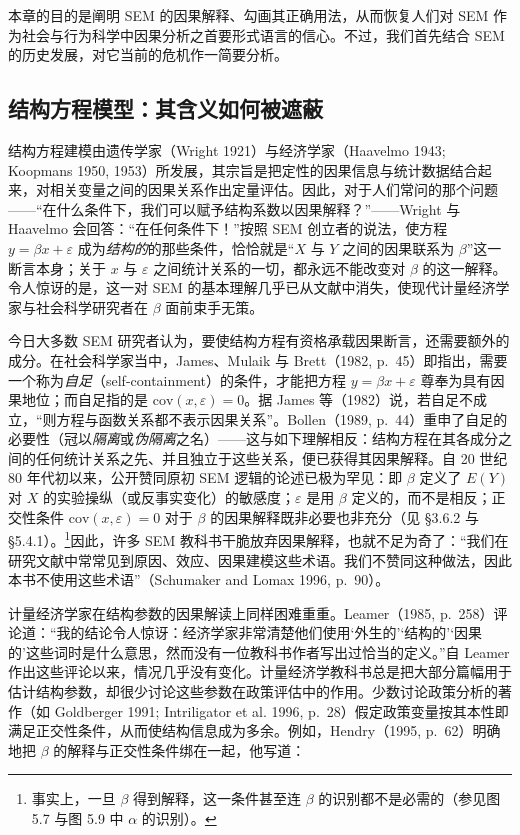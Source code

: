 本章的目的是阐明 SEM 的因果解释、勾画其正确用法，从而恢复人们对 SEM 作为社会与行为科学中因果分析之首要形式语言的信心。不过，我们首先结合 SEM 的历史发展，对它当前的危机作一简要分析。

\subsection{结构方程模型：其含义如何被遮蔽}

结构方程建模由遗传学家（Wright 1921）与经济学家（Haavelmo 1943; Koopmans 1950, 1953）所发展，其宗旨是把定性的因果信息与统计数据结合起来，对相关变量之间的因果关系作出定量评估。因此，对于人们常问的那个问题——“在什么条件下，我们可以赋予结构系数以因果解释？”——Wright 与 Haavelmo 会回答：“在任何条件下！”按照 SEM 创立者的说法，使方程 $y=\beta x+\varepsilon$ 成为\emph{结构的}的那些条件，恰恰就是“$X$ 与 $Y$ 之间的因果联系为 $\beta$”这一断言本身；关于 $x$ 与 $\varepsilon$ 之间统计关系的一切，都永远不能改变对 $\beta$ 的这一解释。令人惊讶的是，这一对 SEM 的基本理解几乎已从文献中消失，使现代计量经济学家与社会科学研究者在 $\beta$ 面前束手无策。

今日大多数 SEM 研究者认为，要使结构方程有资格承载因果断言，还需要额外的成分。在社会科学家当中，James、Mulaik 与 Brett（1982, p.~45）即指出，需要一个称为\emph{自足}（self-containment）的条件，才能把方程 $y=\beta x+\varepsilon$ 尊奉为具有因果地位；而自足指的是 $\mathrm{cov}(x,\varepsilon)=0$。据 James 等（1982）说，若自足不成立，“则方程与函数关系都不表示因果关系”。Bollen（1989, p.~44）重申了自足的必要性（冠以\emph{隔离}或\emph{伪隔离}之名）——这与如下理解相反：结构方程在其各成分之间的任何统计关系之先、并且独立于这些关系，便已获得其因果解释。自 20 世纪 80 年代初以来，公开赞同原初 SEM 逻辑的论述已极为罕见：即 $\beta$ 定义了 $E(Y)$ 对 $X$ 的实验操纵（或反事实变化）的敏感度；$\varepsilon$ 是用 $\beta$ 定义的，而不是相反；正交性条件 $\mathrm{cov}(x,\varepsilon)=0$ 对于 $\beta$ 的因果解释既非必要也非充分（见 \S 3.6.2 与 \S 5.4.1）。\footnote{事实上，一旦 $\beta$ 得到解释，这一条件甚至连 $\beta$ 的识别都不是必需的（参见图 5.7 与图 5.9 中 $\alpha$ 的识别）。}因此，许多 SEM 教科书干脆放弃因果解释，也就不足为奇了：“我们在研究文献中常常见到原因、效应、因果建模这些术语。我们不赞同这种做法，因此本书不使用这些术语”（Schumaker and Lomax 1996, p.~90）。

计量经济学家在结构参数的因果解读上同样困难重重。Leamer（1985, p.~258）评论道：“我的结论令人惊讶：经济学家非常清楚他们使用‘外生的’‘结构的’‘因果的’这些词时是什么意思，然而没有一位教科书作者写出过恰当的定义。”自 Leamer 作出这些评论以来，情况几乎没有变化。计量经济学教科书总是把大部分篇幅用于估计结构参数，却很少讨论这些参数在政策评估中的作用。少数讨论政策分析的著作（如 Goldberger 1991; Intriligator et al. 1996, p.~28）假定政策变量按其本性即满足正交性条件，从而使结构信息成为多余。例如，Hendry（1995, p.~62）明确地把 $\beta$ 的解释与正交性条件绑在一起，他写道：

